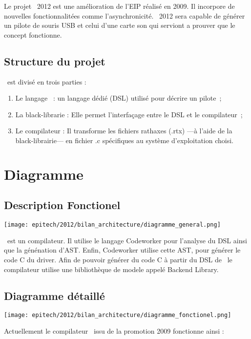 \documentclass{rtxreport}
\begin{document}
Le projet \rtx\ 2012 est une amélioration de l'EIP réalisé en 2009. Il
incorpore de nouvelles fonctionnalitées comme l’asynchronicité. \rtx\ 2012 sera
capable de générer un pilote de souris USB et celui d'une carte son qui serviont a prouver que le concept fonctionne.


\section{Structure du projet}

\rtx\ est divisé en trois parties :

\begin{enumerate}
\item Le langage \rtx\ : un langage dédié (DSL) utilisé pour décrire un pilote~;
\item La black-librarie : Elle permet l'interfaçage entre le DSL et le
compilateur~;
\item Le compilateur : Il transforme les fichiers rathaxes (.rtx) ---à l'aide
de la black-librairie--- en fichier .c spécifiques au système d'exploitation choisi.
\end{enumerate}

\chapter{Diagramme}

\section{Description Fonctionel}

\texttt{[image: epitech/2012/bilan\_architecture/diagramme\_general.png]}

\rtx\ est un compilateur.
Il utilise le langage Codeworker pour l'analyse du DSL ainsi que la génénation d'AST. 
Enfin, Codeworker utilise cette AST, pour générer le code C du driver.
Afin de pouvoir générer du code C à partir du DSL de \rtx\, 
le compilateur utilise une bibliothèque de modele appelé Backend Library.


\section{Diagramme détaillé}

\texttt{[image: epitech/2012/bilan\_architecture/diagramme\_fonctionel.png]}

Actuellement le compilateur \rtx\ issu de la promotion 2009 fonctionne ainsi :
\end{document}
